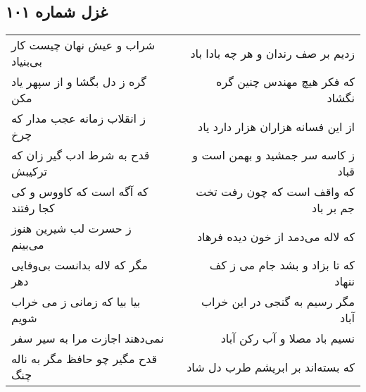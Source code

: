 \begin{center}
\section*{غزل شماره ۱۰۱}
\label{sec:sh101}
\begin{longtable}{l p{0.5cm} r}
شراب و عیش نهان چیست کار بی‌بنیاد
&&
زدیم بر صف رندان و هر چه بادا باد
\\
گره ز دل بگشا و از سپهر یاد مکن
&&
که فکر هیچ مهندس چنین گره نگشاد
\\
ز انقلاب زمانه عجب مدار که چرخ
&&
از این فسانه هزاران هزار دارد یاد
\\
قدح به شرط ادب گیر زان که ترکیبش
&&
ز کاسه سر جمشید و بهمن است و قباد
\\
که آگه است که کاووس و کی کجا رفتند
&&
که واقف است که چون رفت تخت جم بر باد
\\
ز حسرت لب شیرین هنوز می‌بینم
&&
که لاله می‌دمد از خون دیده فرهاد
\\
مگر که لاله بدانست بی‌وفایی دهر
&&
که تا بزاد و بشد جام می ز کف ننهاد
\\
بیا بیا که زمانی ز می خراب شویم
&&
مگر رسیم به گنجی در این خراب آباد
\\
نمی‌دهند اجازت مرا به سیر سفر
&&
نسیم باد مصلا و آب رکن آباد
\\
قدح مگیر چو حافظ مگر به ناله چنگ
&&
که بسته‌اند بر ابریشم طرب دل شاد
\\
\end{longtable}
\end{center}
